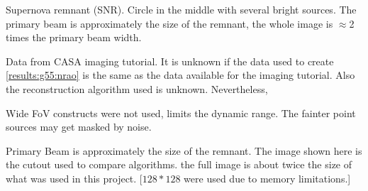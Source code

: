 Supernova remnant (SNR). Circle in the middle with several bright sources. The primary beam is approximately the size of the remnant, the whole image is $\approx$2 times the primary beam width.

Data from CASA imaging tutorial\cite{casaImagingGuide}. It is unknown if the data used to create \ref{results:g55:nrao} is the same as the data available for the imaging tutorial. Also the reconstruction algorithm used is unknown. Nevertheless,

Wide FoV constructs were not used, limits the dynamic range. The fainter point sources may get masked by noise.

Primary Beam is approximately the size of the remnant. The image shown here is the cutout used to compare algorithms. the full image is about twice the size of what was used in this project. [$128*128$ were used due to memory limitations.]

